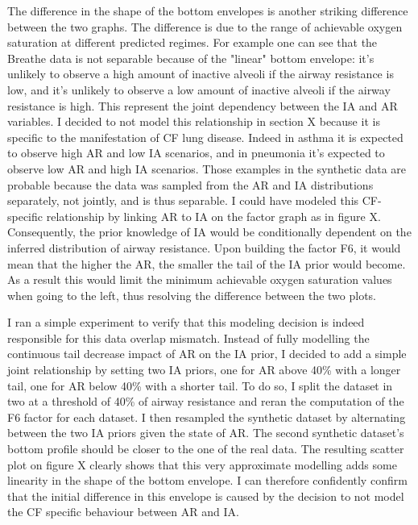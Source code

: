 The difference in the shape of the bottom envelopes is another striking difference between the two graphs. The difference is due to the range of achievable oxygen saturation at different predicted \F regimes. 
For example one can see that the Breathe data is not separable because of the "linear" bottom envelope: it's unlikely to observe a high amount of inactive alveoli if the airway resistance is low, and it's unlikely to observe a low amount of inactive alveoli if the airway resistance is high. This represent the joint dependency between the IA and AR variables. I decided to not model this relationship in section X because it is specific to the manifestation of CF lung disease. Indeed in asthma it is expected to observe high AR and low IA scenarios, and in pneumonia it's expected to observe low AR and high IA scenarios. Those examples in the synthetic data are probable because the data was sampled from the AR and IA distributions separately, not jointly, and is thus separable.
I could have modeled this CF-specific relationship by linking AR to IA on the factor graph as in figure X. Consequently, the prior knowledge of IA would be conditionally dependent on the inferred distribution of airway resistance. Upon building the factor F6, it would mean that the higher the AR, the smaller the tail of the IA prior would become. As a result this would limit the minimum achievable oxygen saturation values when going to the left, thus resolving the difference between the two plots. 

I ran a simple experiment to verify that this modeling decision is indeed responsible for this data overlap mismatch. Instead of fully modelling the continuous tail decrease impact of AR on the IA prior, I decided to add a simple joint relationship by setting two IA priors, one for AR above 40\% with a longer tail, one for AR below 40\% with a shorter tail. To do so, I split the dataset in two at a threshold of 40\% of airway resistance and reran the computation of the F6 factor for each dataset. I then resampled the synthetic dataset by alternating between the two IA priors given the state of AR. The second synthetic dataset's bottom profile should be closer to the one of the real data. The resulting scatter plot on figure X clearly shows that this very approximate modelling adds some linearity in the shape of the bottom envelope. I can therefore confidently confirm that the initial difference in this envelope is caused by the decision to not model the CF specific behaviour between AR and IA.

